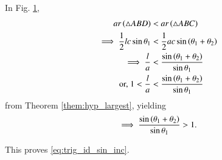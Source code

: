 \begin{enumerate}[label=\thesubsection.\arabic*.,ref=\thesubsection.\theenumi]
\begin{figure}[!ht]
	\begin{center}
		
		\resizebox{0.6\columnwidth}{!}{}
	\end{center}
	\caption{}
	\label{fig:tri_sin_inc}	
\end{figure}
\solution In Fig. \ref{fig:tri_sin_inc}, 	
%
\begin{align}
ar\left(\triangle ABD\right) &< ar \left(\triangle ABC\right)
\\
\implies \frac{1}{2}lc \sin \theta_1 &<  \frac{1}{2}ac \sin \left(\theta_1 + \theta_2 \right)
\\
\implies \frac{l}{a} &< \frac{\sin \left(\theta_1 + \theta_2 \right)}{\sin \theta_1}
\\
\text{or, } 1 < \frac{l}{a} &< \frac{\sin \left(\theta_1 + \theta_2 \right)}{\sin \theta_1}
\end{align}
%
from Theorem \ref{them:hyp_largest}, yielding 
\begin{align}
\implies \frac{\sin \left(\theta_1 + \theta_2 \right)}{\sin \theta_1} > 1.
\end{align}

This proves \eqref{eq:trig_id_sin_inc}.
\end{enumerate}
%
